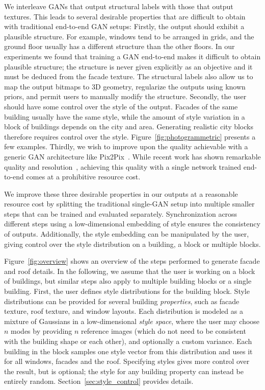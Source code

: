 We interleave GANs that output structural labels with those that output textures. This leads to several desirable properties that are difficult to obtain with traditional end-to-end GAN setups:
%
Firstly, the output should exhibit a plausible structure. For example, windows tend to be arranged in grids, and the ground floor usually has a different structure than the other floors. In our experiments we found that training a GAN end-to-end makes it difficult to obtain plausible structure; the structure is never given explicitly as an objective and it must be deduced from the facade texture. The structural labels also allow us to map the output bitmaps to 3D geometry, regularize the outputs using known priors, and permit users to manually modify the structure.
%
Secondly, the user should have some control over the style of the output. Facades of the same building usually have the same style, while the amount of style variation in a block of buildings depends on the city and area. Generating realistic city blocks therefore requires control over the style. Figure~\ref{fig:photogrammetric} presents a few examples. 
%
Thirdly, we wish to improve upon the quality achievable with a generic GAN architecture like Pix2Pix~\cite{pix2pix}. While recent work has shown remarkable quality and resolution~\cite{Karras:2018:PGG}, achieving this quality with a single network trained end-to-end comes at a prohibitive resource cost.

We improve these three desirable properties in our outputs at a reasonable resource cost by splitting the traditional single-GAN setup into multiple smaller steps that can be trained and evaluated separately. Synchronization across different steps using a low-dimensional embedding of style ensures the consistency of outputs. Additionally, the style embedding can be manipulated by the user, giving control over the style distribution on a building, a block or multiple blocks.

Figure~\ref{fig:overview} shows an overview of the steps performed to generate facade and roof details. In the following, we assume that the user is working on a block of buildings, but similar steps also apply to multiple building blocks or a single building. First, the user defines style distributions for the building block. Style distributions can be provided for several building \emph{properties}, such as facade texture, roof texture, and window layouts. Each distribution is modeled as a mixture of Gaussians in a low-dimensional \emph{style space}, where the user may choose $n$ modes by providing $n$ reference images (which do not need to be consistent with the building shape or each other), and optionally a custom variance. Each building in the block samples one style vector from this distribution and uses it for all windows, facades and the roof. Specifying styles gives more control over the result, but is optional; the style for any building property can instead be entirely random. Section~\ref{sec:style_control} provides details.

